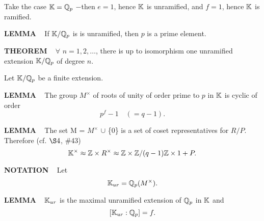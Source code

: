 \vspace{0.1cm}

Take the case $\mathbb{K} = \mathbb{Q}_{p}$ $-$then $e = 1$, hence $\mathbb{K}$ is unramified, and $f = 1$, hence $\mathbb{K}$ is ramified.

\vspace{0.1cm}

\begin{x}{\small\bf LEMMA} \ %
If $\mathbb{K}/\mathbb{Q}_{p}$ is is unramified, then $p$ is a prime element.
\end{x}

\vspace{0.1cm}

\begin{x}{\small\bf THEOREM} \ %
$\forall$ $n = 1, 2, \ldots$,  there is up to isomorphism one unramified extension $\mathbb{K}/\mathbb{Q}_{p}$ of degree $n$.
\end{x}

\vspace{0.1cm}

Let $\mathbb{K}/\mathbb{Q}_{p}$ be a finite extension.

\vspace{0.1cm}

\begin{x}{\small\bf LEMMA} \ %
The group $M^\times$ of roots of unity of order prime to $p$ in $\mathbb{K}$ is cyclic of order 
\[
p^f - 1 \quad \text{$(= q-1)$}.
\]
\end{x}

\vspace{0.1cm}

\begin{x}{\small\bf LEMMA} \ %
The set M = $M^\times$ $\cup$ \{0\} is  a set of coset representatives for $R/P$. Therefore (cf. $\S4$, $\#$43)
\[
\mathbb{K}^\times \approx \mathbb{Z} \times R^\times \approx \mathbb{Z} \times \mathbb{Z}/(q-1)\mathbb{Z} \times1 + P.
\]
\end{x}

\vspace{0.1cm}

\begin{x}{\small\bf NOTATION} \ %
Let
\[
\mathbb{K}_{ur} = \mathbb{Q}_p(M^\times).
\]
\end{x}


\begin{x}{\small\bf LEMMA} \ %
$\mathbb{K}_{ur}$ is the maximal unramified extension of $\mathbb{Q}_p$ in $\mathbb{K}$ and
\[
[\mathbb{K}_{ur}:\mathbb{Q}_p] = f.
\]
\end{x}

